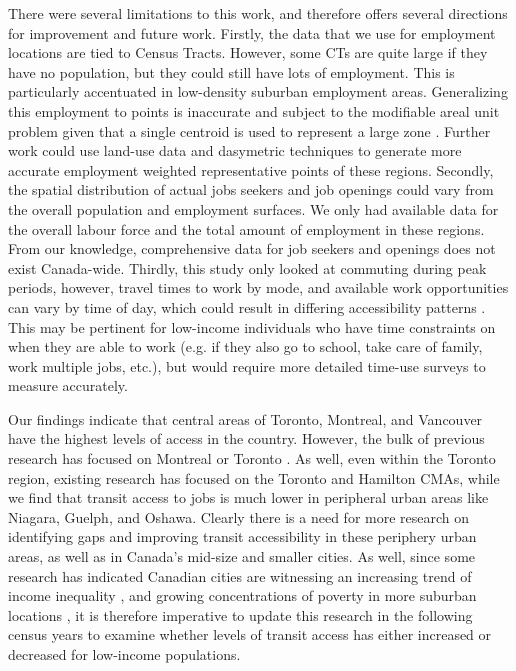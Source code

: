 \documentclass[11 pt, letterpaper]{article}
\begin{document}
{There were several limitations to this work, and therefore offers several directions for improvement and future work. Firstly, the data that we use for employment locations are tied to Census Tracts. However, some CTs are quite large if they have no population, but they could still have lots of employment. This is particularly accentuated in low-density suburban employment areas. Generalizing this employment to points is inaccurate and subject to the modifiable areal unit problem given that a single centroid is used to represent a large zone \cite{kwan2008}. Further work could use land-use data and dasymetric techniques to generate more accurate employment weighted representative points of these regions. Secondly, the spatial distribution of actual jobs seekers and job openings could vary from the overall population and employment surfaces. We only had available data for the overall labour force and the total amount of employment in these regions. From our knowledge, comprehensive data for job seekers and openings does not exist Canada-wide. Thirdly, this study only looked at commuting during peak periods, however, travel times to work by mode, and available work opportunities can vary by time of day, which could result in differing accessibility patterns \cite{elgeneidy2016tor}. This may be pertinent for low-income individuals who have time constraints on when they are able to work (e.g. if they also go to school, take care of family, work multiple jobs, etc.), but would require more detailed time-use surveys to measure accurately.

Our findings indicate that central areas of Toronto, Montreal, and Vancouver have the highest levels of access in the country. However, the bulk of previous research has focused on Montreal or Toronto \cite{foth2013,manaugh2012,farber2017g}. As well, even within the Toronto region, existing research has focused on the Toronto and Hamilton CMAs, while we find that transit access to jobs is much lower in peripheral urban areas like Niagara, Guelph, and Oshawa. Clearly there is a need for more research on identifying gaps and improving transit accessibility in these periphery urban areas, as well as in Canada's mid-size and smaller cities. As well, since some research has indicated Canadian cities are witnessing an increasing trend of income inequality \cite{bolton2012,walks2013}, and growing concentrations of poverty in more suburban locations \cite{ades2012}, it is therefore imperative to update this research in the following census years to examine whether levels of transit access has either increased or decreased for low-income populations. 



}
\end{document}

